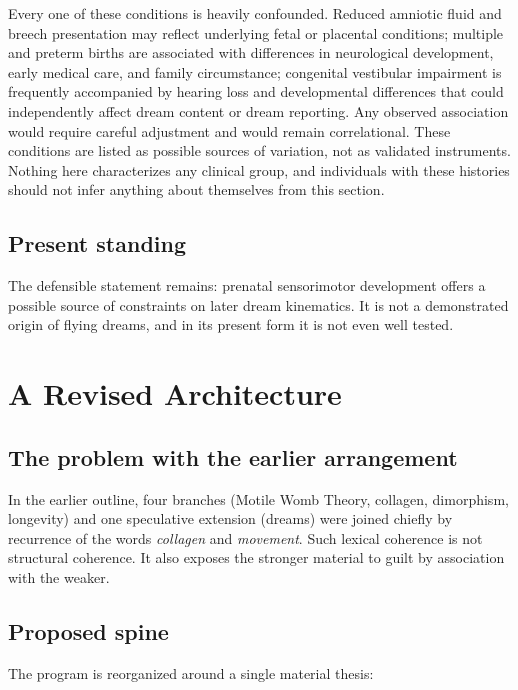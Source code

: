 \documentclass[11pt,a4paper]{article}
\theoremstyle{plain}
\theoremstyle{definition}
\theoremstyle{remark}
\begin{document}
\begin{caution}
Every one of these conditions is heavily confounded. Reduced amniotic fluid and breech presentation may reflect underlying fetal or placental conditions; multiple and preterm births are associated with differences in neurological development, early medical care, and family circumstance; congenital vestibular impairment is frequently accompanied by hearing loss and developmental differences that could independently affect dream content or dream reporting. Any observed association would require careful adjustment and would remain correlational. These conditions are listed as possible sources of variation, not as validated instruments. Nothing here characterizes any clinical group, and individuals with these histories should not infer anything about themselves from this section.
\end{caution}

\subsection{Present standing}

The defensible statement remains: prenatal sensorimotor development offers a possible source of constraints on later dream kinematics. It is not a demonstrated origin of flying dreams, and in its present form it is not even well tested.

\section{A Revised Architecture}\label{sec:architecture}

\subsection{The problem with the earlier arrangement}

In the earlier outline, four branches (Motile Womb Theory, collagen, dimorphism, longevity) and one speculative extension (dreams) were joined chiefly by recurrence of the words \emph{collagen} and \emph{movement}. Such lexical coherence is not structural coherence. It also exposes the stronger material to guilt by association with the weaker.

\subsection{Proposed spine}

The program is reorganized around a single material thesis:
\end{document}
